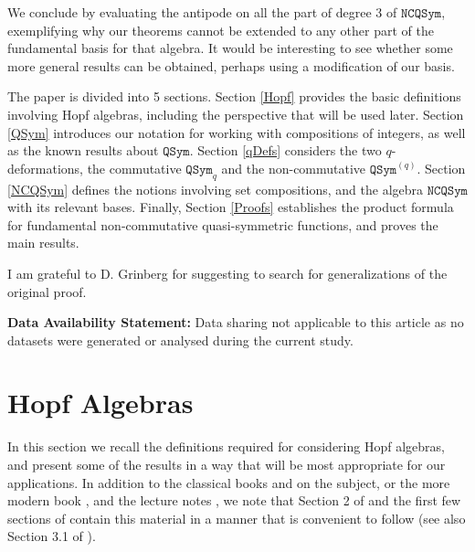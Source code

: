 \documentclass{article}
\theoremstyle{definition}
\begin{document}
We conclude by evaluating the antipode on all the part of degree 3 of $\mathtt{NCQSym}$, exemplifying why our theorems cannot be extended to any other part of the fundamental basis for that algebra. It would be interesting to see whether some more general results can be obtained, perhaps using a modification of our basis.

\medskip

The paper is divided into 5 sections. Section \ref{Hopf} provides the basic definitions involving Hopf algebras, including the perspective that will be used later. Section \ref{QSym} introduces our notation for working with compositions of integers, as well as the known results about $\mathtt{QSym}$. Section \ref{qDefs} considers the two $q$-deformations, the commutative $\mathtt{QSym}_{q}$ and the non-commutative $\mathtt{QSym}^{(q)}$. Section \ref{NCQSym} defines the notions involving set compositions, and the algebra $\mathtt{NCQSym}$ with its relevant bases. Finally, Section \ref{Proofs} establishes the product formula for fundamental non-commutative quasi-symmetric functions, and proves the main results.

\medskip

I am grateful to D. Grinberg for suggesting to search for generalizations of the original proof.

\textbf{Data Availability Statement:} Data sharing not applicable to this article as no datasets were generated or analysed during the current study.

\section{Hopf Algebras \label{Hopf}}

In this section we recall the definitions required for considering Hopf algebras, and present some of the results in a way that will be most appropriate for our applications. In addition to the classical books \cite{[S]} and \cite{[Mo]} on the subject, or the more modern book \cite{[U]}, and the lecture notes \cite{[GR]}, we note that Section 2 of \cite{[P]} and the first few sections of \cite{[D]} contain this material in a manner that is convenient to follow (see also Section 3.1 of \cite{[LMvW]}).

\medskip
\end{document}
